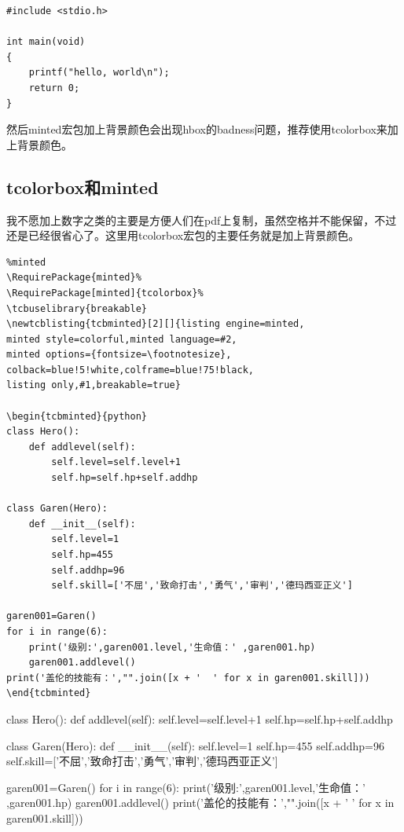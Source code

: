 \documentclass[12pt,oneside]{book}
\begin{document}
\begin{common-format}
\begin{verbatim}
#include <stdio.h>

int main(void)
{
    printf("hello, world\n");
    return 0;
}
\end{verbatim}

然后minted宏包加上背景颜色会出现hbox的badness问题，推荐使用tcolorbox来加上背景颜色。


\subsection{tcolorbox和minted}
我不愿加上数字之类的主要是方便人们在pdf上复制，虽然空格并不能保留，不过还是已经很省心了。这里用tcolorbox宏包的主要任务就是加上背景颜色。

\begin{Verbatim}
%minted
\RequirePackage{minted}%
\RequirePackage[minted]{tcolorbox}%
\tcbuselibrary{breakable}
\newtcblisting{tcbminted}[2][]{listing engine=minted,
minted style=colorful,minted language=#2,
minted options={fontsize=\footnotesize},
colback=blue!5!white,colframe=blue!75!black,
listing only,#1,breakable=true}

\begin{tcbminted}{python}
class Hero():
    def addlevel(self):
        self.level=self.level+1
        self.hp=self.hp+self.addhp

class Garen(Hero):
    def __init__(self):
        self.level=1
        self.hp=455
        self.addhp=96
        self.skill=['不屈','致命打击','勇气','审判','德玛西亚正义']

garen001=Garen()
for i in range(6):
    print('级别:',garen001.level,'生命值：' ,garen001.hp)
    garen001.addlevel()
print('盖伦的技能有：',"".join([x + '  ' for x in garen001.skill]))
\end{tcbminted}
\end{Verbatim}

\begin{tcbpython}[]
class Hero():
    def addlevel(self):
        self.level=self.level+1
        self.hp=self.hp+self.addhp

class Garen(Hero):
    def __init__(self):
        self.level=1
        self.hp=455
        self.addhp=96
        self.skill=['不屈','致命打击','勇气','审判','德玛西亚正义']

garen001=Garen()
for i in range(6):
    print('级别:',garen001.level,'生命值：' ,garen001.hp)
    garen001.addlevel()
print('盖伦的技能有：',"".join([x + '  ' for x in garen001.skill]))
\end{tcbpython}




\end{common-format}
\end{document}
